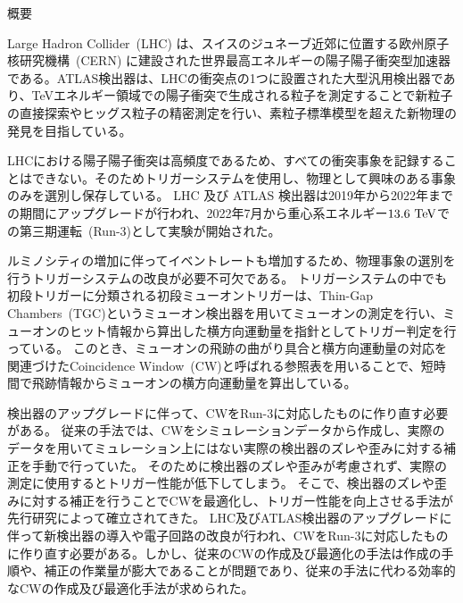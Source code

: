 \begin{center}
  \begin{huge}
    概要
  \end{huge}
\end{center}

\vspace{10pt}

Large Hadron Collider~(LHC) は、スイスのジュネーブ近郊に位置する欧州原子核研究機構~(CERN) に建設された世界最高エネルギーの陽子陽子衝突型加速器である。ATLAS検出器は、LHCの衝突点の1つに設置された大型汎用検出器であり、TeVエネルギー領域での陽子衝突で生成される粒子を測定することで新粒子の直接探索やヒッグス粒子の精密測定を行い、素粒子標準模型を超えた新物理の発見を目指している。

LHCにおける陽子陽子衝突は高頻度であるため、すべての衝突事象を記録することはできない。そのためトリガーシステムを使用し、物理として興味のある事象のみを選別し保存している。
LHC 及び ATLAS 検出器は2019年から2022年までの期間にアップグレードが行われ、2022年7月から重心系エネルギー$13.6~{\rm TeV}$での第三期運転~(Run-3)として実験が開始された。

ルミノシティの増加に伴ってイベントレートも増加するため、物理事象の選別を行うトリガーシステムの改良が必要不可欠である。
トリガーシステムの中でも初段トリガーに分類される初段ミューオントリガーは、Thin-Gap Chambers~(TGC)というミューオン検出器を用いてミューオンの測定を行い、ミューオンのヒット情報から算出した横方向運動量を指針としてトリガー判定を行っている。
このとき、ミューオンの飛跡の曲がり具合と横方向運動量の対応を関連づけたCoincidence Window~(CW)と呼ばれる参照表を用いることで、短時間で飛跡情報からミューオンの横方向運動量を算出している。

検出器のアップグレードに伴って、CWをRun-3に対応したものに作り直す必要がある。
従来の手法では、CWをシミュレーションデータから作成し、実際のデータを用いてミュレーション上にはない実際の検出器のズレや歪みに対する補正を手動で行っていた。
そのために検出器のズレや歪みが考慮されず、実際の測定に使用するとトリガー性能が低下してしまう。
そこで、検出器のズレや歪みに対する補正を行うことでCWを最適化し、トリガー性能を向上させる手法が先行研究によって確立されてきた。
LHC及びATLAS検出器のアップグレードに伴って新検出器の導入や電子回路の改良が行われ、CWをRun-3に対応したものに作り直す必要がある。しかし、従来のCWの作成及び最適化の手法は作成の手順や、補正の作業量が膨大であることが問題であり、従来の手法に代わる効率的なCWの作成及び最適化手法が求められた。

